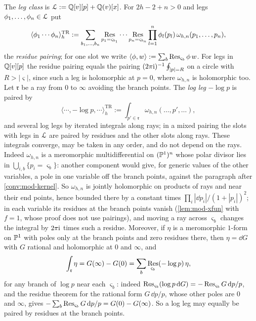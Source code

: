 \begin{defn}
\label{def:mod-pair}
The \emph{leg class} is $\mathcal{L}:=\mathbb{Q}[v][p]+\mathbb{Q}(v)[x]$. For $2h-2+n>0$ and legs $\phi_1,\dots,\phi_n\in\mathcal{L}$ put
\[
\langle\phi_1\cdots\phi_n\rangle^{\mathrm{TR}}_h:=\sum_{b_1,\dots,b_n}\operatorname*{Res}_{p_1=\varsigma_{b_1}}\cdots\operatorname*{Res}_{p_n=\varsigma_{b_n}}\prod_{l=1}^n\phi_l(p_l)\,\omega_{h,n}(p_1,\dots,p_n),
\]
the \emph{residue pairing}; for one slot we write $\langle\phi,w\rangle:=\sum_b\operatorname*{Res}_{\varsigma_b}\phi\,w$. For legs in $\mathbb{Q}[v][p]$ the residue pairing equals the pairing $(2\pi\mathrm{i})^{-1}\oint_{|p|=R}$ on a circle with $R>|\varsigma|$, since such a leg is holomorphic at $p=0$, where $\omega_{h,n}$ is holomorphic too. Let $\mathfrak r$ be a ray from $0$ to $\infty$ avoiding the branch points. The \emph{log leg} $-\log p$ is paired by
\[
\langle\cdots,-\log p,\cdots\rangle^{\mathrm{TR}}_h:=\int_{p'\in\mathfrak r}\omega_{h,n}(\dots,p',\dots),
\]
and several log legs by iterated integrals along rays; in a mixed pairing the slots with legs in $\mathcal{L}$ are paired by residues and the other slots along rays. These integrals converge, may be taken in any order, and do not depend on the rays. Indeed $\omega_{h,n}$ is a meromorphic multidifferential on $(\mathbb{P}^1)^n$ whose polar divisor lies in $\bigcup_{i,b}\{p_i=\varsigma_b\}$: another component would give, for generic values of the other variables, a pole in one variable off the branch points, against the paragraph after \cref{conv:mod-kernel}. So $\omega_{h,n}$ is jointly holomorphic on products of rays and near their end points, hence bounded there by a constant times $\prod_i|\dd p_i|/(1+|p_i|)^2$; in each variable its residues at the branch points vanish (\cref{lem:mod-xfun} with $f=1$, whose proof does not use pairings), and moving a ray across $\varsigma_b$ changes the integral by $2\pi\mathrm{i}$ times such a residue. Moreover, if $\eta$ is a meromorphic $1$-form on $\mathbb{P}^1$ with poles only at the branch points and zero residues there, then $\eta=\dd G$ with $G$ rational and holomorphic at $0$ and $\infty$, and
\[
\int_{\mathfrak r}\eta=G(\infty)-G(0)=\sum_b\operatorname*{Res}_{\varsigma_b}(-\log p)\,\eta,
\]
for any branch of $\log p$ near each $\varsigma_b$: indeed $\operatorname*{Res}_{\varsigma_b}(\log p\,\mathrm{d} G)=-\operatorname*{Res}_{\varsigma_b}G\,\mathrm{d} p/p$, and the residue theorem for the rational form $G\,\dd p/p$, whose other poles are $0$ and $\infty$, gives $-\sum_b\operatorname*{Res}_{\varsigma_b}G\,\mathrm{d} p/p=G(0)-G(\infty)$. So a log leg may equally be paired by residues at the branch points.
\end{defn}

